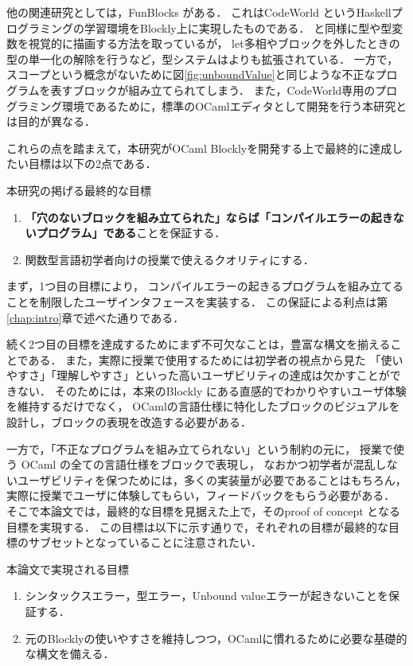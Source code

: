 他の関連研究としては，FunBlocks \cite{FunBlocks}がある．
これはCodeWorld \cite{CodeWorld} というHaskellプログラミングの学習環境をBlockly上に実現したものである．
\cite{Typed-Blockly}と同様に型や型変数を視覚的に描画する方法を取っているが，
let多相やブロックを外したときの型の単一化の解除を行うなど，型システムは\cite{Typed-Blockly}よりも拡張されている．
一方で，スコープという概念がないために図\ref{fig:unboundValue}と同じような不正なプログラムを表すブロックが組み立てられてしまう．
また，CodeWorld専用のプログラミング環境であるために，標準のOCamlエディタとして開発を行う本研究とは目的が異なる．

これらの点を踏まえて，本研究がOCaml Blocklyを開発する上で最終的に達成したい目標は以下の2点である．

\begin{itembox}[l]{本研究の掲げる最終的な目標}
  \begin {enumerate}
    \item {\bf 「穴のないブロックを組み立てられた」ならば「コンパイルエラーの起きないプログラム」である}ことを保証する．
    \item 関数型言語初学者向けの授業で使えるクオリティにする．
  \end {enumerate}
\end{itembox}

まず，1つ目の目標により，
コンパイルエラーの起きるプログラムを組み立てることを制限したユーザインタフェースを実装する．
この保証による利点は第\ref{chap:intro}章で述べた通りである．

続く2つ目の目標を達成するためにまず不可欠なことは，豊富な構文を揃えることである．
また，実際に授業で使用するためには初学者の視点から見た
「使いやすさ」「理解しやすさ」といった高いユーザビリティの達成は欠かすことができない．
そのためには，本来のBlockly にある直感的でわかりやすいユーザ体験を維持するだけでなく，
OCamlの言語仕様に特化したブロックのビジュアルを設計し，ブロックの表現を改造する必要がある．

一方で，「不正なプログラムを組み立てられない」という制約の元に，
授業で使う OCaml の全ての言語仕様をブロックで表現し，
なおかつ初学者が混乱しないユーザビリティを保つためには，多くの実装量が必要であることはもちろん，
実際に授業でユーザに体験してもらい，フィードバックをもらう必要がある．
そこで本論文では，最終的な目標を見据えた上で，そのproof of concept となる目標を実現する．
この目標は以下に示す通りで，それぞれの目標が最終的な目標のサブセットとなっていることに注意されたい．
\begin{itembox}[l]{本論文で実現される目標}
  \begin {enumerate}
    \item シンタックスエラー，型エラー，Unbound valueエラーが起きないことを保証する．
    \item 元のBlocklyの使いやすさを維持しつつ，OCamlに慣れるために必要な基礎的な構文を備える．
  \end {enumerate}
\end{itembox}

